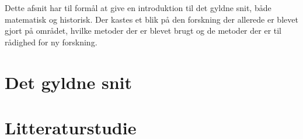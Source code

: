 \textsf{
Dette afsnit har til formål at give en introduktion til det gyldne snit,
både matematisk og historisk. Der kastes et blik på den forskning der
allerede er blevet gjort på området, hvilke metoder der er blevet brugt
og de metoder der er til rådighed for ny forskning.
}

\section{Det gyldne snit}


\section{Litteraturstudie}


